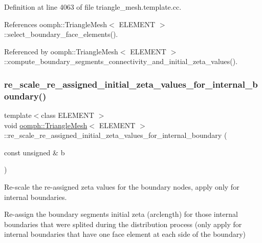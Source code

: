 Definition at line 4063 of file triangle\+\_\+mesh.\+template.\+cc.



References oomph\+::\+Triangle\+Mesh$<$ E\+L\+E\+M\+E\+N\+T $>$\+::select\+\_\+boundary\+\_\+face\+\_\+elements().



Referenced by oomph\+::\+Triangle\+Mesh$<$ E\+L\+E\+M\+E\+N\+T $>$\+::compute\+\_\+boundary\+\_\+segments\+\_\+connectivity\+\_\+and\+\_\+initial\+\_\+zeta\+\_\+values().

\mbox{\label{classoomph_1_1TriangleMesh_a6a33a04b552311d9c9c258fa40e262de}} 
\subsubsection{\texorpdfstring{re\+\_\+scale\+\_\+re\+\_\+assigned\+\_\+initial\+\_\+zeta\+\_\+values\+\_\+for\+\_\+internal\+\_\+boundary()}{re\_scale\_re\_assigned\_initial\_zeta\_values\_for\_internal\_boundary()}}
{\footnotesize\ttfamily template$<$class E\+L\+E\+M\+E\+NT $>$ \\
void \hyperlink{classoomph_1_1TriangleMesh}{oomph\+::\+Triangle\+Mesh}$<$ E\+L\+E\+M\+E\+NT $>$\+::re\+\_\+scale\+\_\+re\+\_\+assigned\+\_\+initial\+\_\+zeta\+\_\+values\+\_\+for\+\_\+internal\+\_\+boundary (\begin{DoxyParamCaption}\item[{const unsigned \&}]{b }\end{DoxyParamCaption})}



Re-\/scale the re-\/assigned zeta values for the boundary nodes, apply only for internal boundaries. 

Re-\/assign the boundary segments initial zeta (arclength) for those internal boundaries that were splited during the distribution process (only apply for internal boundaries that have one face element at each side of the boundary) 

